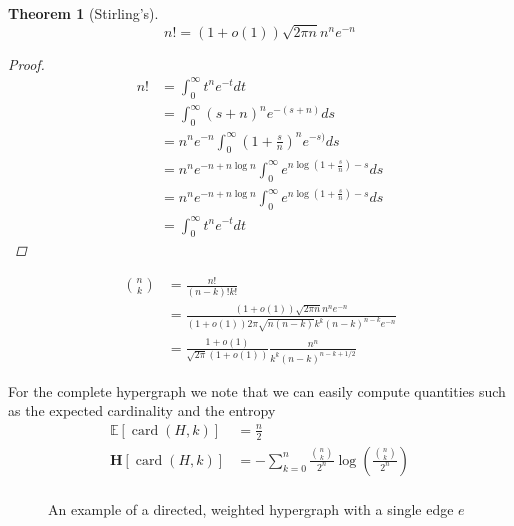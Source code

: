 \documentclass{article}
\newcommand{\parens}[1]{\left( #1 \right)}
\newcommand{\brackets}[1]{\left[ #1 \right]}
\newcommand{\expect}[1]{\mathbb{E}\brackets{#1}}
\DeclareMathOperator{\card}{card}
\newcommand{\cardi}[1]{\card \parens{ #1 }}
\newtheorem{theorem}{Theorem}
\begin{document}
\begin{theorem}[Stirling's]
    \begin{equation}
        n! = (1 + o(1)) \sqrt{2 \pi n} n^n e^{-n}
    \end{equation}
    \begin{proof}
    \begin{align}
        n! &= \int_0^\infty t^n e^{-t} dt \\
        &= \int_0^\infty (s+n)^{n} e^{-(s+n)} ds \\
        &= n^n e^{-n} \int_0^\infty \parens{ 1 + \frac{s}{n}}^{n} e^{-s)} ds \\
        &= n^n e^{-n + n \log n} \int_0^\infty e^{n \log \parens{1 + \frac{s}{n}} - s} ds \\
        &= n^n e^{-n + n \log n} \int_0^\infty e^{n \log \parens{1 + \frac{s}{n}} - s} ds \\
        &= \int_0^\infty t^n e^{-t} dt 
    \end{align}
\end{proof}
\end{theorem}

\begin{align}
    \binom{n}{k} &= \frac{n!}{(n-k)! k!} \\
    &= \frac{(1 + o(1))\sqrt{2 \pi n} n^n e^{-n}}{(1+o(1)) 2 \pi \sqrt{n (n-k)} k^k (n-k)^{n-k} e^{-n}} \\
    &= \frac{1 + o(1)}{\sqrt{2 \pi}(1+o(1))} \frac{n^n}{ k^k (n-k)^{n-k + 1/2}}
\end{align}

For the complete hypergraph we note that we can easily compute quantities such as the expected cardinality and the entropy
\begin{align}
    \expect{\cardi{H, k}} &= \frac{n}{2} \\
    \mathbf{H} \brackets{\cardi{H, k}} &= - \sum_{k=0}^{n} \frac{\binom{n}{k}}{2^n} \log \parens{\frac{\binom{n}{k}}{2^n}}\\
\end{align}


\begin{figure}
    \caption[Hypergraph]{An example of a directed, weighted hypergraph with a single edge $e$}


\end{figure}
\end{document}
